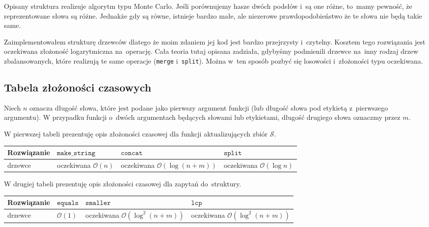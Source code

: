 \documentclass[declaration,shortabstract]{iithesis}
\theoremstyle{definition} \newtheorem{definition}{Definicja}[chapter]
\theoremstyle{plain} \newtheorem{remark}[definition]{Obserwacja}
\theoremstyle{plain} \newtheorem{theorem}[definition]{Twierdzenie}
\theoremstyle{plain} \newtheorem{example}{Przykład}[definition]
\theoremstyle{plain} \newtheorem{lemma}[definition]{Lemat}
\begin{document}
Opisany struktura realizuje algorytm typu Monte Carlo. Jeśli porównujemy hasze dwóch podsłów i~są one różne, to~mamy pewność, że reprezentowane słowa są różne. Jednakże gdy są równe, istnieje bardzo małe, ale niezerowe prawdopodobieństwo że te słowa nie będą takie same.

Zaimplementowałem strukturę drzewców dlatego że moim zdaniem jej kod jest bardzo przejrzysty i~czytelny. Kosztem tego rozwiązania jest oczekiwana złożoność logarytmiczna na~operację. Cała teoria tutaj opisana zadziała, gdybyśmy podmienili drzewce na~inny rodzaj drzew zbalansowanych, które realizują te same operacje (\texttt{merge} i~\texttt{split}). Można w~ten sposób pozbyć się losowości i~złożoności typu oczekiwana.

\subsection{Tabela złożoności czasowych}

Niech $n$ oznacza długość słowa, które jest podane jako pierwszy argument funkcji (lub długość słowa pod etykietą z~pierwszego argumentu). W przypadku funkcji o~dwóch argumentach będących słowami lub etykietami, długość drugiego słowa oznaczmy przez $m$.

W pierwszej tabeli prezentuję opis złożoności czasowej dla funkcji aktualizujących zbiór $\mathcal{S}$.

\begin{center}
    \begin{tabular}{ | m{3cm} | >{\centering\arraybackslash}m{3cm} | >{\centering\arraybackslash}m{3cm} | >{\centering\arraybackslash}m{3cm} | }
        \hline 
        Rozwiązanie & $\texttt{make\_string}$ & $\texttt{concat}$ & $\texttt{split}$ \\
        \hline
        drzewce & oczekiwana $\mathcal{O}(n)$ & oczekiwana $\mathcal{O}(\log(n + m))$ & oczekiwana $\mathcal{O}(\log n)$ \\
        \hline
    \end{tabular}
\end{center}

W drugiej tabeli prezentuję opis złożoności czasowej dla zapytań do~struktury.

\begin{center}
    \begin{tabular}{ | m{3cm} | >{\centering\arraybackslash}m{3cm} | >{\centering\arraybackslash}m{3cm} | >{\centering\arraybackslash}m{3cm} | }
        \hline 
        Rozwiązanie & $\texttt{equals}$ & $\texttt{smaller}$ & $\texttt{lcp}$ \\
        \hline
        drzewce & $\mathcal{O}(1)$ & oczekiwana $\mathcal{O}(\log^2(n + m))$ & oczekiwana $\mathcal{O}(\log^2(n + m))$ \\
        \hline
    \end{tabular}
\end{center}
\end{document}
